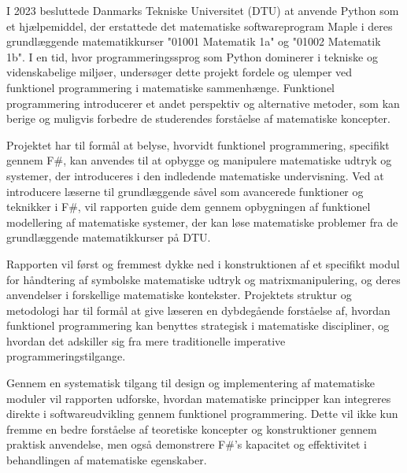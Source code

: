 I 2023 besluttede Danmarks Tekniske Universitet (DTU) at anvende Python som et hjælpemiddel, der erstattede det matematiske softwareprogram Maple i deres grundlæggende matematikkurser "01001 Matematik 1a" og "01002 Matematik 1b". I en tid, hvor programmeringssprog som Python dominerer i tekniske og videnskabelige miljøer, undersøger dette projekt fordele og ulemper ved funktionel programmering i matematiske sammenhænge. Funktionel programmering introducerer et andet perspektiv og alternative metoder, som kan berige og muligvis forbedre de studerendes forståelse af matematiske koncepter.

Projektet har til formål at belyse, hvorvidt funktionel programmering, specifikt gennem F\#, kan anvendes til at opbygge og manipulere matematiske udtryk og systemer, der introduceres i den indledende matematiske undervisning. Ved at introducere læserne til grundlæggende såvel som avancerede funktioner og teknikker i F\#, vil rapporten guide dem gennem opbygningen af funktionel modellering af matematiske systemer, der kan løse matematiske problemer fra de grundlæggende matematikkurser på DTU.

Rapporten vil først og fremmest dykke ned i konstruktionen af et specifikt modul for håndtering af symbolske matematiske udtryk og matrixmanipulering, og deres anvendelser i forskellige matematiske kontekster. Projektets struktur og metodologi har til formål at give læseren en dybdegående forståelse af, hvordan funktionel programmering kan benyttes strategisk i matematiske discipliner, og hvordan det adskiller sig fra mere traditionelle imperative programmeringstilgange.

Gennem en systematisk tilgang til design og implementering af matematiske moduler vil rapporten udforske, hvordan matematiske principper kan integreres direkte i softwareudvikling gennem funktionel programmering. Dette vil ikke kun fremme en bedre forståelse af teoretiske koncepter og konstruktioner gennem praktisk anvendelse, men også demonstrere F\#'s kapacitet og effektivitet i behandlingen af matematiske egenskaber.

